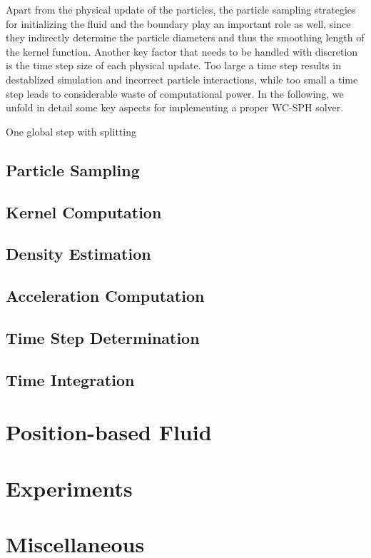 \documentclass[
	11pt, 
	DIV10,
	ngerman,
	a4paper, 
	oneside, 
	headings=normal, 
	captions=tableheading,
	final, 
	numbers=noenddot
]{scrartcl}
\begin{document}
Apart from the physical update of the particles, the particle sampling strategies for initializing the fluid and the boundary play an important role as well, since they indirectly determine the particle diameters and thus the smoothing length of the kernel function. Another key factor that needs to be handled with discretion is the time step size of each physical update. Too large a time step results in destablized simulation and incorrect particle interactions, while too small a time step leads to considerable waste of computational power. In the following, we unfold in detail some key aspects for implementing a proper WC-SPH solver.

\large
\begin{algorithm}
	\DontPrintSemicolon
	\SetAlgoLined
	\SetAlCapNameFnt{\large}
	\SetAlCapFnt{\large}
	\caption{\label{alg1} One global step with splitting \cite{reinhardt2017fully}}
\end{algorithm}
\normalsize

\subsection{Particle Sampling}
\subsection{Kernel Computation}
\subsection{Density Estimation}
\subsection{Acceleration Computation}
\subsection{Time Step Determination}
\subsection{Time Integration}

\section{Position-based Fluid}
\label{sec3}
\section{Experiments}
\label{sec4}
\section{Miscellaneous}
\label{sec5}




\end{document}
